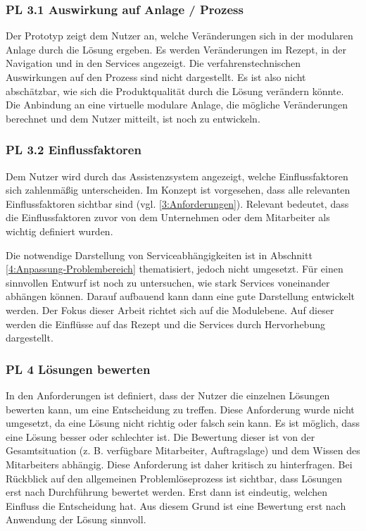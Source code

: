 \subsubsection*{PL 3.1 Auswirkung auf Anlage / Prozess}
Der Prototyp zeigt dem Nutzer an, welche Veränderungen sich in der modularen Anlage durch die Lösung ergeben. Es werden Veränderungen im Rezept, in der Navigation und in den Services angezeigt. Die verfahrenstechnischen Auswirkungen auf den Prozess sind nicht dargestellt. Es ist also nicht abschätzbar, wie sich die Produktqualität durch die Lösung verändern könnte. Die Anbindung an eine virtuelle modulare Anlage, die mögliche Veränderungen berechnet und dem Nutzer mitteilt, ist noch zu entwickeln.

\subsubsection*{PL 3.2 Einflussfaktoren}
Dem Nutzer wird durch das Assistenzsystem angezeigt, welche Einflussfaktoren sich zahlenmäßig unterscheiden. Im Konzept ist vorgesehen, dass alle relevanten Einflussfaktoren sichtbar sind (vgl. \ref{3:Anforderungen}). Relevant bedeutet, dass die Einflussfaktoren zuvor von dem Unternehmen oder dem Mitarbeiter als wichtig definiert wurden.

Die notwendige Darstellung von Serviceabhängigkeiten ist in Abschnitt \ref{4:Anpassung-Problembereich} thematisiert, jedoch nicht umgesetzt. Für einen sinnvollen Entwurf ist noch zu untersuchen, wie stark Services voneinander abhängen können. Darauf aufbauend kann dann eine gute Darstellung entwickelt werden. Der Fokus dieser Arbeit richtet sich auf die Modulebene. Auf dieser werden die Einflüsse auf das Rezept und die Services durch Hervorhebung dargestellt.

\subsubsection*{PL 4 Lösungen bewerten}
In den Anforderungen ist definiert, dass der Nutzer die einzelnen Lösungen bewerten kann, um eine Entscheidung zu treffen. Diese Anforderung wurde nicht umgesetzt, da eine Lösung nicht richtig oder falsch sein kann. Es ist möglich, dass eine Lösung besser oder schlechter ist. Die Bewertung dieser ist von der Gesamtsituation (z. B. verfügbare Mitarbeiter, Auftragslage) und dem Wissen des Mitarbeiters abhängig. Diese Anforderung ist daher kritisch zu hinterfragen. Bei Rückblick auf den allgemeinen Problemlöseprozess ist sichtbar, dass Lösungen erst nach Durchführung bewertet werden. Erst dann ist eindeutig, welchen Einfluss die Entscheidung hat. Aus diesem Grund ist eine Bewertung erst nach Anwendung der Lösung sinnvoll.

